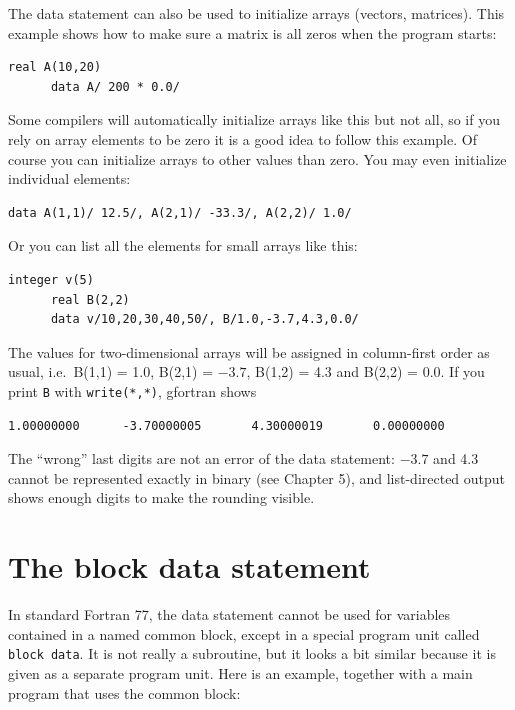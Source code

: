 The data statement can also be used to initialize arrays (vectors, matrices). This example shows how to make sure a matrix is all zeros when the program starts:

\begin{lstlisting}[style=fortran77]
      real A(10,20)
      data A/ 200 * 0.0/
\end{lstlisting}

Some compilers will automatically initialize arrays like this but not all, so if you rely on array elements to be zero it is a good idea to follow this example. Of course you can initialize arrays to other values than zero. You may even initialize individual elements:

\begin{lstlisting}[style=fortran77]
      data A(1,1)/ 12.5/, A(2,1)/ -33.3/, A(2,2)/ 1.0/
\end{lstlisting}

Or you can list all the elements for small arrays like this:

\begin{lstlisting}[style=fortran77]
      integer v(5)
      real B(2,2)
      data v/10,20,30,40,50/, B/1.0,-3.7,4.3,0.0/
\end{lstlisting}

The values for two-dimensional arrays will be assigned in column-first order as usual, i.e.\ B(1,1) = 1.0, B(2,1) = $-3.7$, B(1,2) = 4.3 and B(2,2) = 0.0. If you print \texttt{B} with \texttt{write(*,*)}, gfortran shows

\begin{lstlisting}[style=output]
   1.00000000      -3.70000005       4.30000019       0.00000000
\end{lstlisting}

The ``wrong'' last digits are not an error of the data statement: $-3.7$ and 4.3 cannot be represented exactly in binary (see Chapter 5), and list-directed output shows enough digits to make the rounding visible.

\section{The block data statement}

In standard Fortran 77, the data statement cannot be used for variables contained in a named common block, except in a special program unit called \texttt{block data}. It is not really a subroutine, but it looks a bit similar because it is given as a separate program unit. Here is an example, together with a main program that uses the common block:

